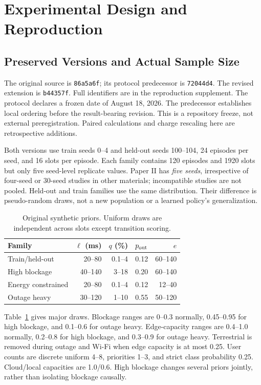 \section{Experimental Design and Reproduction}
\subsection{Preserved Versions and Actual Sample Size}
The original source is \texttt{86a5a6f}; its protocol predecessor is \texttt{72044d4}. The revised extension is \texttt{b44357f}. Full identifiers are in the reproduction supplement. The protocol declares a frozen date of August 18, 2026. The predecessor establishes local ordering before the result-bearing revision. This is a repository freeze, not external preregistration. Paired calculations and charge rescaling here are retrospective additions.

Both versions use train seeds 0--4 and held-out seeds 100--104, 24 episodes per seed, and 16 slots per episode. Each family contains 120 episodes and 1920 slots but only five seed-level replicate values. Paper II has \emph{five seeds}, irrespective of four-seed or 30-seed studies in other materials; incompatible studies are not pooled. Held-out and train families use the same distribution. Their difference is pseudo-random draws, not a new population or a learned policy's generalization.

\begin{table}[t]
\caption{Original synthetic priors. Uniform draws are independent across slots except transition scoring.}\label{tab:families}
\centering\footnotesize
\begin{tabular}{lrrrr}
\toprule Family & $\ell$ (ms) & $q$ (\%) & $p_{\rm out}$ & $e$ \\
\midrule
Train/held-out & 20--80 & 0.1--4 & 0.12 & 60--140 \\
High blockage & 40--140 & 3--18 & 0.20 & 60--140 \\
Energy constrained & 20--80 & 0.1--4 & 0.12 & 12--40 \\
Outage heavy & 30--120 & 1--10 & 0.55 & 50--120 \\
\bottomrule\end{tabular}
\end{table}

Table~\ref{tab:families} gives major draws. Blockage ranges are 0--0.3 normally, 0.45--0.95 for high blockage, and 0.1--0.6 for outage heavy. Edge-capacity ranges are 0.4--1.0 normally, 0.2--0.8 for high blockage, and 0.3--0.9 for outage heavy. Terrestrial is removed during outage and Wi-Fi when edge capacity is at most 0.25. User counts are discrete uniform 4--8, priorities 1--3, and strict class probability 0.25. Cloud/local capacities are 1.0/0.6. High blockage changes several priors jointly, rather than isolating blockage causally.

